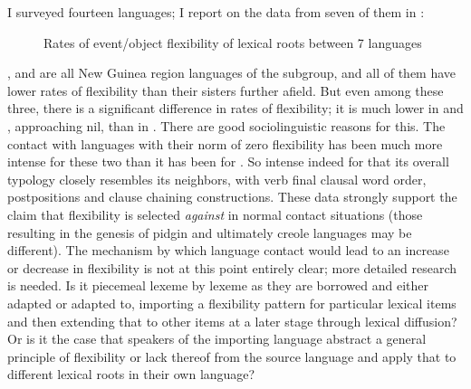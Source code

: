 \documentclass[output=paper]{langsci/langscibook}
\begin{document}
 I surveyed fourteen  languages; I report on the data from seven of them in :

\begin{figure} 
\caption{Rates of event/object flexibility of lexical roots between 7  languages}
\label{fig:foley:fourteenlgs}
\end{figure}

{,  and  are all New Guinea region  languages of the  subgroup, and all of them have lower rates of flexibility  than their sisters further afield. But even among these three, there is a significant difference in rates of flexibility; it is much lower in  and , approaching nil, than in . There are good sociolinguistic reasons for this. The contact  with  languages with their norm of zero flexibility has been much more intense for these two than it has been for . So intense indeed for  that its overall typology closely resembles its  neighbors, with verb final clausal word order, postpositions and clause chaining constructions. These data strongly support the claim that flexibility is selected \textit{against} in normal contact situations (those resulting in the genesis of pidgin and ultimately creole languages may be different). The mechanism by which language contact  would lead to an increase or decrease in flexibility is not at this point entirely clear; more detailed research is needed. Is it piecemeal lexeme by lexeme as they are borrowed and either adapted or adapted to, importing a flexibility  pattern for particular lexical items and then extending that to other items at a later stage through lexical diffusion? Or is it the case that speakers of the importing language abstract a general principle of flexibility or lack thereof from the source language and apply that to different lexical roots in their own language?}
 
\end{document}
